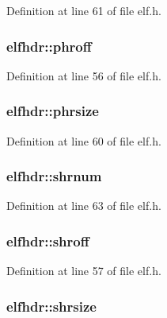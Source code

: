 \-Definition at line 61 of file elf.\-h.

\hypertarget{structelfhdr_aeff5a468f7f1e3c03c54caaf5a5f30d4}{
\subsubsection[{phroff}]{ {\bf elfhdr\-::phroff}}}\label{structelfhdr_aeff5a468f7f1e3c03c54caaf5a5f30d4}


\-Definition at line 56 of file elf.\-h.

\hypertarget{structelfhdr_a25da2da02b100a32e10297ec10bb72b1}{
\subsubsection[{phrsize}]{ {\bf elfhdr\-::phrsize}}}\label{structelfhdr_a25da2da02b100a32e10297ec10bb72b1}


\-Definition at line 60 of file elf.\-h.

\hypertarget{structelfhdr_aee30993babcc6987c3c428d58157e6cf}{
\subsubsection[{shrnum}]{ {\bf elfhdr\-::shrnum}}}\label{structelfhdr_aee30993babcc6987c3c428d58157e6cf}


\-Definition at line 63 of file elf.\-h.

\hypertarget{structelfhdr_a92953e553ac2459b8ecd23109d6921f5}{
\subsubsection[{shroff}]{ {\bf elfhdr\-::shroff}}}\label{structelfhdr_a92953e553ac2459b8ecd23109d6921f5}


\-Definition at line 57 of file elf.\-h.

\hypertarget{structelfhdr_a90dfa1d488ee147b66fee113dc7d9230}{
\subsubsection[{shrsize}]{ {\bf elfhdr\-::shrsize}}}\label{structelfhdr_a90dfa1d488ee147b66fee113dc7d9230}


